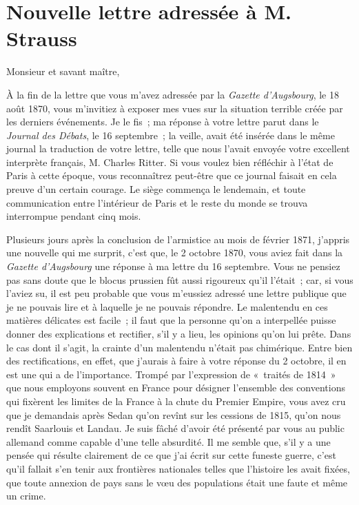 \documentclass[french,twoside]{book} %
\newcommand{\dateline}[1]{\medskip{\RaggedLeft{#1}\par}\bigskip}
\begin{document}
\section[{Nouvelle lettre adressée à M. Strauss}]{Nouvelle lettre adressée à M. Strauss}\renewcommand{\leftmark}{Nouvelle lettre adressée à M. Strauss}


\dateline{Le 15 septembre 1871}
\noindent Monsieur et savant maître,\par
À la fin de la lettre que vous m’avez adressée par la {\itshape Gazette d’Augsbourg}, le 18 août 1870, vous m’invitiez à exposer mes vues sur la situation terrible créée par les derniers événements. Je le fis ; ma réponse à votre lettre parut dans le {\itshape Journal des Débats}, le 16 septembre ; la veille, avait été insérée dans le même journal la traduction de votre lettre, telle que nous l’avait envoyée votre excellent interprète français, M. Charles Ritter. Si vous voulez bien réfléchir à l’état de Paris à cette époque, vous reconnaîtrez peut-être que ce journal faisait en cela preuve d’un certain courage. Le siège commença le lendemain, et toute communication entre l’intérieur de Paris et le reste du monde se trouva interrompue pendant cinq mois.\par
Plusieurs jours après la conclusion de l’armistice au mois de février 1871, j’appris une nouvelle qui me surprit, c’est que, le 2 octobre 1870, vous aviez fait dans la {\itshape Gazette d’Augsbourg} une réponse à ma lettre du 16 septembre. Vous ne pensiez pas sans doute que le blocus prussien fût aussi rigoureux qu’il l’était ; car, si vous l’aviez su, il est peu probable que vous m’eussiez adressé une lettre publique que je ne pouvais lire et à laquelle je ne pouvais répondre. Le malentendu en ces matières délicates est facile ; il faut que la personne qu’on a interpellée puisse donner des explications et rectifier, s’il y a lieu, les opinions qu’on lui prête. Dans le cas dont il s’agit, la crainte d’un malentendu n’était pas chimérique. Entre bien des rectifications, en effet, que j’aurais à faire à votre réponse du 2 octobre, il en est une qui a de l’importance. Trompé par l’expression de « traités de 1814 » que nous employons souvent en France pour désigner l’ensemble des conventions qui fixèrent les limites de la France à la chute du Premier Empire, vous avez cru que je demandais après Sedan qu’on revînt sur les cessions de 1815, qu’on nous rendît Saarlouis et Landau. Je suis fâché d’avoir été présenté par vous au public allemand comme capable d’une telle absurdité. Il me semble que, s’il y a une pensée qui résulte clairement de ce que j’ai écrit sur cette funeste guerre, c’est qu’il fallait s’en tenir aux frontières nationales telles que l’histoire les avait fixées, que toute annexion de pays sans le vœu des populations était une faute et même un crime.\par
\end{document}
